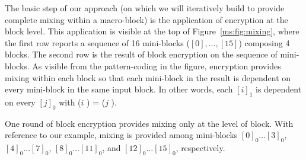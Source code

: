 The basic step of our approach (on which we will iteratively build to provide complete mixing within a macro-block) is the application of encryption at the block level. This application is visible at the top of Figure~\ref{ms:fig:mixing}, where the first row reports a sequence of 16 mini-blocks ($[0],\ldots,[15]$) composing 4 blocks. The second row is the result of block encryption on the sequence of mini-blocks. As visible from the pattern-coding in the figure, encryption provides mixing within each block so that each mini-block in the result is dependent on every mini-block in the same input block. In other words, each $[i]_1$ is dependent on every $[j]_0$ with ($i$ ) = ($j$ ).

One round of block encryption provides mixing only at the level of block. With reference to our example, mixing is provided among mini-blocks $[0]_0 \ldots [3]_0$, $[4]_0 \ldots [7]_0$, $[8]_0 \ldots [11]_0$, and $[12]_0 \ldots [15]_0$, respectively.
%

